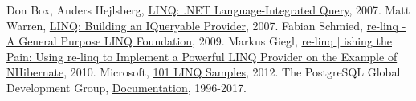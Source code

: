 
 Don Box, Anders Hejlsberg, \href{https://msdn.microsoft.com/en-us/library/bb308959.aspx}{LINQ: .NET Language-Integrated Query}, 2007.
 Matt Warren, \href{https://blogs.msdn.microsoft.com/mattwar/2007/07/30/linq-building-an-iqueryable-provider-part-i/}{LINQ: Building an IQueryable Provider}, 2007.
 Fabian Schmied, \href{https://www.re-motion.org/download/re-linq.pdf}{re-linq - A General Purpose LINQ Foundation}, 2009.
 Markus Giegl, \href{https://www.codeproject.com/Articles/42059/re-linq-ishing-the-Pain-Using-re-linq-to-Implement}{re-linq $\vert$ ishing the Pain: Using re-linq to Implement a Powerful LINQ Provider on the Example of NHibernate}, 2010.
 Microsoft, \href{https://code.msdn.microsoft.com/101-LINQ-Samples-3fb9811b}{101 LINQ Samples}, 2012.
 The PostgreSQL Global Development Group, \href{https://www.postgresql.org/docs/}{Documentation}, 1996-2017.
